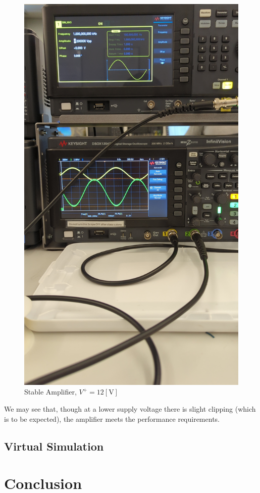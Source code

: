 \documentclass[
	letterpaper, %
	10pt, %
]{CSUniSchoolLabReport}
\begin{document}
\begin{figure}[H]
  \centering
  \includegraphics[width=.9\textwidth]{Figures/L4F5}
  \caption{Stable Amplifier, $V^{+}=12[\si{\volt}]$}
  \label{fig:7}
\end{figure}

We may see that, though at a lower supply voltage there is slight clipping (which is to be expected), the amplifier meets the performance requirements.

\subsection{Virtual Simulation}

\section{Conclusion}
\end{document}
